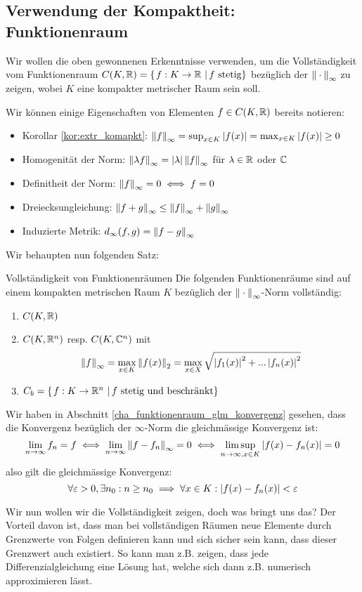 \subsection{Verwendung der Kompaktheit: Funktionenraum}
Wir wollen die oben gewonnenen Erkenntnisse verwenden, um die Vollständigkeit vom Funktionenraum $C(K, \mathbb{R}) = \left\{\left.f: K \to \mathbb{R} \ \right| f \text{ stetig} \right\}$ bezüglich der $\left\|\:\cdot\:\right\|_\infty$ zu zeigen, wobei $K$ eine  kompakter metrischer Raum sein soll.

Wir können einige Eigenschaften von Elementen $f \in C(K, \mathbb{R})$ bereits notieren:
\begin{itemize}
    \item Korollar \ref{kor:extr_komapkt}: $\left\|f\right\|_\infty = \sup_{x \in K}\left|f(x)\right| = \max_{x \in K}\left|f(x)\right|\geq 0$
    \item Homogenität der Norm: $\left\|\lambda f\right\|_\infty = \left|\lambda\right| \left\|f\right\|_\infty$ für $\lambda \in \mathbb{R}$ oder $\mathbb{C}$ 
    \item Definitheit der Norm: $\left\|f\right\|_\infty = 0 \iff f=0$
    \item Dreiecksungleichung: $\left\|f+g\right\|_\infty \leq \left\|f\right\|_\infty + \left\|g\right\|_\infty$
    \item Induzierte Metrik: $d_\infty(f,g) = \left\|f - g\right\|_\infty$
\end{itemize}
Wir behaupten nun folgenden Satz:
\begin{satz}{Vollständigkeit von Funktionenräumen}{}
Die folgenden Funktionenräume sind auf einem kompakten metrischen Raum $K$ bezüglich der $\left\|\:\cdot\:\right\|_\infty$-Norm vollständig:
\begin{enumerate}[label=(\alph*)]
    \item $C(K, \mathbb{R})$
    \item $C(K, \mathbb{R}^n)$ resp. $C(K, \mathbb{C}^n)$ mit
        $$\left\|f\right\|_\infty = \max_{x \in K}\left\|f(x)\right\|_2 = \max_{x \in X} \sqrt{\left|f_1(x)\right|^2 + ... \left|f_n(x)\right|^2}$$ 
    \item $C_b = \left\{\left.f: K \to \mathbb{R}^n \ \right| f \text{ stetig und beschränkt} \right\}$
\end{enumerate}
\end{satz}
\begin{remark}
Wir haben in Abschnitt \ref{cha_funktionenraum_glm_konvergenz} gesehen, dass die Konvergenz bezüglich der $\infty$-Norm die gleichmässige Konvergenz ist: 
$$\lim_{n \to \infty}f_n = f \iff \lim_{n \to \infty}\left\|f-f_n\right\|_\infty = 0 \iff \limsup_{n \to \infty, x \in K} \left|f(x) - f_n(x)\right| = 0$$
also gilt die gleichmässige Konvergenz:
$$\forall \varepsilon >0, \exists n_0: n \geq n_0 \implies \forall x \in K: \left|f(x)-f_n(x)\right| < \varepsilon$$
\end{remark}
Wir nun wollen wir die Vollständigkeit zeigen, doch was bringt uns das? Der Vorteil davon ist, dass man bei vollständigen Räumen neue Elemente durch Grenzwerte von Folgen definieren kann und sich sicher sein kann, dass dieser Grenzwert auch existiert. So kann man z.B. zeigen, dass jede Differenzialgleichung eine Lösung hat, welche sich dann z.B. numerisch approximieren lässt.

